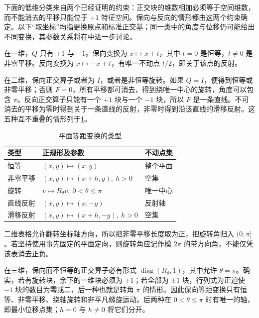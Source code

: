 下面的低维分类来自两个已经证明的约束：正交块的维数相加必须等于空间维数，而不能消去的平移只能位于 \(+1\) 特征空间。保向与反向的情形都由这两个约束确定。以下“取坐标”均指更换原点和标准正交基；同一类中的角度与位移仍可能给出不同变换，其参数关系将在中进一步讨论。

\ProseParagraphBreak

在一维，\(Q\) 只有 \(+1\) 与 \(-1\)。保向变换为 \(x\mapsto x+t\)，其中 \(t=0\) 是恒等，\(t\ne0\) 是非零平移。反向变换为 \(x\mapsto-x+t\)，有唯一不动点 \(t/2\)，即关于该点的反射。

\ProseParagraphBreak

在二维，保向正交算子或者为 \(I\)，或者是非恒等旋转。如果 \(Q=I\)，便得到恒等或非零平移；否则 \(F=0\)，所有平移都可消去，得到绕唯一中心的旋转，角度可以包含 \(\pi\)。反向正交算子只能有一个 \(+1\) 块与一个 \(-1\) 块，所以 \(F\) 是一条直线。不可消去的平移为零时得到关于一条直线的反射，非零时得到沿该直线的滑移反射。这五种互不重叠的情形列于\cref{g1:tab:plane-isometries}。

\begin{table}[htbp]
	\centering
	\caption{平面等距变换的类型}
	\label{g1:tab:plane-isometries}
	\begin{tabularx}{\linewidth}{@{}l l X@{}}
		\toprule
		类型 & 正规形及参数 & 不动点集 \\
		\midrule
		恒等 & \((x,y)\mapsto(x,y)\) & 整个平面 \\
		非零平移 & \((x,y)\mapsto(x+h,y),\ h>0\) & 空集 \\
		旋转 & \(v\mapsto R_\theta v,\ 0<\theta\leq\pi\) & 唯一中心 \\
		直线反射 & \((x,y)\mapsto(x,-y)\) & 反射轴 \\
		滑移反射 & \((x,y)\mapsto(x+h,-y),\ h>0\) & 空集 \\
		\bottomrule
	\end{tabularx}
\end{table}

二维表格允许翻转坐标轴方向，所以把非零平移长度取为正，把旋转角归入 \((0,\pi]\)。若坚持使用事先固定的平面定向，则旋转角应记作模 \(2\pi\) 的带方向角，不能仅凭该表消去正负。

\ProseParagraphBreak

在三维，保向而不恒等的正交算子必有形式 \(\operatorname{diag}(R_\theta,1)\)，其中允许 \(\theta=\pi\)。确实，若有旋转块，余下的一维块必须为 \(+1\)；若全部为 \(\pm1\) 块，行列式为正迫使 \(-1\) 块的数目为零或二，后一种也就是转角 \(\pi\) 的情形。因此保向等距变换只有恒等、非零平移、绕轴旋转和非平凡螺旋运动。后两种在 \(0<\theta\leq\pi\) 时有唯一的轴，即最小位移点集；\(h=0\) 与 \(h\ne0\) 将它们分开。

